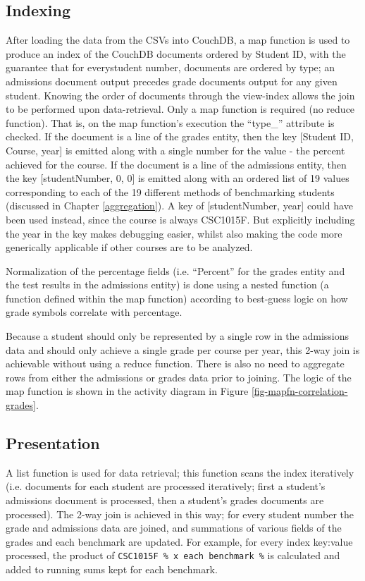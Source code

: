 \subsection{Indexing}
After loading the data from the CSVs into CouchDB, a map function is used to produce an index of the CouchDB documents ordered by Student ID, with the guarantee that for everystudent number, documents are ordered by type; an admissions document output precedes grade documents output for any given student. Knowing the order of documents through the view-index allows the join to be performed upon data-retrieval. Only a map function is required (no reduce function). That is, on the map function’s execution the ``type\_'' attribute is checked. If the document is a line of the grades entity, then the key [Student ID, Course, year] is emitted along with a single number for the value - the percent achieved for the course. If the document is a line of the admissions entity, then the key [studentNumber, 0, 0] is emitted along with an ordered list of 19 values corresponding to each of the 19 different methods of benchmarking students (discussed in Chapter \ref{aggregation}). A key of [studentNumber, year] could have been used instead, since the course is always CSC1015F. But explicitly including the year in the key makes debugging easier, whilst also making the code more generically applicable if other courses are to be analyzed.

Normalization of the percentage fields (i.e. ``Percent'' for the grades entity and the test results in the admissions entity) is done using a nested function (a function defined within the map function) according to best-guess logic on how grade symbols correlate with percentage.

Because a student should only be represented by a single row in the admissions data and should only achieve a single grade per course per year, this 2-way join is achievable without using a reduce function. There is also no need to aggregate rows from either the admissions or grades data prior to joining. The logic of the map function is shown in the activity diagram in Figure \ref{fig-mapfn-correlation-grades}.



\subsection{Presentation}
A list function is used for data retrieval; this function scans the index iteratively (i.e. documents for each student are processed iteratively; first a student's admissions document is processed, then a student's grades documents are processed). The 2-way join is achieved in this way; for every student number the grade and admissions data are joined, and summations of various fields of the grades and each benchmark are updated. For example, for every index key:value processed, the product of \texttt{CSC1015F \% x each benchmark \%} is calculated and added to running sums kept for each benchmark.

